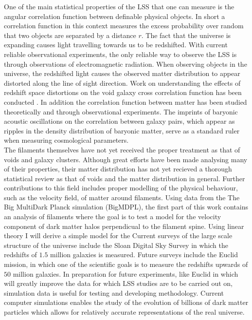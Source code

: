 One of the main statistical properties of the LSS that one can measure is the angular correlation function between definable physical objects. In short a correlation function in this context measures the excess probability over random that two objects are separated by a distance $r$. The fact that the universe is expanding\cite{Hubble168} causes light travelling towards us to be redshifted. With current reliable observational experiments, the only reliable way to observe the LSS is through observations of electromagnetic radiation. When observing objects in the universe, the redshifted light causes the observed matter distribution to appear distorted along the line of sight direction. Work on understanding the effects of redshift space distortions on the void galaxy cross correlation function has been conducted \cite{Nadathur_corr}. In addition the correlation function between matter has been studied theoretically\cite{peebles1980} and through observational experiments\cite{Eisenstein_2005}. The imprints of baryonic acoustic oscillations on the correlation between galaxy pairs\cite{pe00300h}, which appear as ripples in the density distribution of baryonic matter, serve as a standard ruler when measuring cosmological parameters.\\\indent
The filaments themselves have not yet received the proper treatment as that of voids and galaxy clusters. Although great efforts have been made analysing many of their properties\cite{Libeskind_2017}, their matter distribution has not yet recieved a thorough statistical review as that of voids and the matter distribution in general. Further contributions to this field includes proper modelling of the physical behaviour, such as the velocity field, of matter around filaments. Using data from the The Big MultiDark Planck simulation (BigMDPL)\cite{Multidark_dataset}, the first part of this work contains an analysis of filaments where the goal is to test a model for the velocity component of dark matter halos perpendicual to the filament spine. Using linear theory I will derive a simple model for the 
Current surveys of the large scale structure of the universe include the Sloan Digital Sky Survey \cite{Eisenstein_2011} in which the redshifts of $1.5$ million galaxies is measured. Future surveys include the Euclid mission, in which one of the scientific goals is to measure the redshifts upwards of $50$ million galaxies\cite{eucliddefinition}. In preparation for future experiments, like Euclid in which will greatly improve the data for which LSS studies are to be carried out on, simulation data is useful for testing and developing methodology. Current computer simulations enables the study of the evolution of billions of dark matter particles\cite{Millennium}\cite{Multidark_dataset} which allows for relatively accurate representations of the real universe.\\\indent